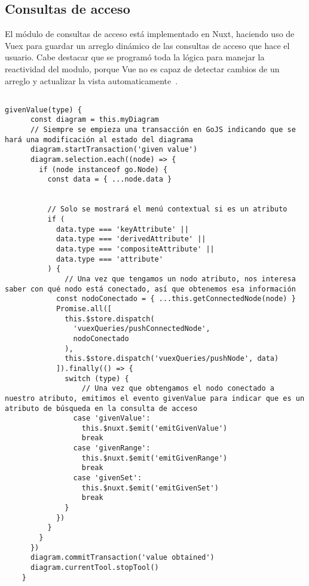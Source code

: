 \subsection{Consultas de acceso}

El módulo de consultas de acceso está implementado en Nuxt, haciendo uso de Vuex para guardar un arreglo dinámico de las consultas de acceso que hace el usuario. Cabe destacar que se programó toda la lógica para manejar la reactividad del modulo, porque Vue no es capaz de detectar cambios de un arreglo y actualizar la vista automaticamente~\cite{noauthor_vue_2020}.



\begin{code}
\label{code:queries}
\begin{verbatim}

givenValue(type) {
      const diagram = this.myDiagram
      // Siempre se empieza una transacción en GoJS indicando que se hará una modificación al estado del diagrama
      diagram.startTransaction('given value')
      diagram.selection.each((node) => {
        if (node instanceof go.Node) {
          const data = { ...node.data }

          
          // Solo se mostrará el menú contextual si es un atributo
          if (
            data.type === 'keyAttribute' ||
            data.type === 'derivedAttribute' ||
            data.type === 'compositeAttribute' ||
            data.type === 'attribute'
          ) {
              // Una vez que tengamos un nodo atributo, nos interesa saber con qué nodo está conectado, así que obtenemos esa información
            const nodoConectado = { ...this.getConnectedNode(node) }
            Promise.all([
              this.$store.dispatch(
                'vuexQueries/pushConnectedNode',
                nodoConectado
              ),
              this.$store.dispatch('vuexQueries/pushNode', data)
            ]).finally(() => {
              switch (type) {
                  // Una vez que obtengamos el nodo conectado a nuestro atributo, emitimos el evento givenValue para indicar que es un atributo de búsqueda en la consulta de acceso
                case 'givenValue':
                  this.$nuxt.$emit('emitGivenValue')
                  break
                case 'givenRange':
                  this.$nuxt.$emit('emitGivenRange')
                  break
                case 'givenSet':
                  this.$nuxt.$emit('emitGivenSet')
                  break
              }
            })
          }
        }
      })
      diagram.commitTransaction('value obtained')
      diagram.currentTool.stopTool()
    }


\end{verbatim}
\end{code}
